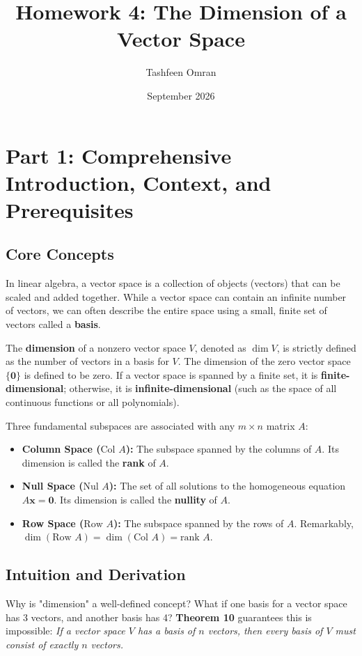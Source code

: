 \documentclass[12pt]{article}
\title{Homework 4: The Dimension of a Vector Space}
\author{Tashfeen Omran}
\date{September 2026}
\begin{document}
\maketitle
\tableofcontents
\newpage

\section{Part 1: Comprehensive Introduction, Context, and Prerequisites}

\subsection{Core Concepts}
In linear algebra, a vector space is a collection of objects (vectors) that can be scaled and added together. While a vector space can contain an infinite number of vectors, we can often describe the entire space using a small, finite set of vectors called a \textbf{basis}. 

The \textbf{dimension} of a nonzero vector space $V$, denoted as $\dim V$, is strictly defined as the number of vectors in a basis for $V$. The dimension of the zero vector space $\{\mathbf{0}\}$ is defined to be zero. If a vector space is spanned by a finite set, it is \textbf{finite-dimensional}; otherwise, it is \textbf{infinite-dimensional} (such as the space of all continuous functions or all polynomials).

Three fundamental subspaces are associated with any $m \times n$ matrix $A$:
\begin{itemize}
    \item \textbf{Column Space ($\text{Col } A$):} The subspace spanned by the columns of $A$. Its dimension is called the \textbf{rank} of $A$.
    \item \textbf{Null Space ($\text{Nul } A$):} The set of all solutions to the homogeneous equation $A\mathbf{x} = \mathbf{0}$. Its dimension is called the \textbf{nullity} of $A$.
    \item \textbf{Row Space ($\text{Row } A$):} The subspace spanned by the rows of $A$. Remarkably, $\dim(\text{Row } A) = \dim(\text{Col } A) = \text{rank } A$.
\end{itemize}

\subsection{Intuition and Derivation}
Why is "dimension" a well-defined concept? What if one basis for a vector space has 3 vectors, and another basis has 4? \textbf{Theorem 10} guarantees this is impossible: \textit{If a vector space $V$ has a basis of $n$ vectors, then every basis of $V$ must consist of exactly $n$ vectors.} 
\end{document}
